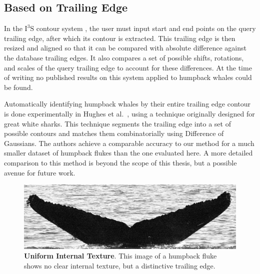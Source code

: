 \subsection{Based on Trailing Edge}

In the $\text{I}^3\text{S}$ contour system \cite{i3scontour}, the user must input start and end points on the query trailing edge, after which its contour is extracted.
This trailing edge is then resized and aligned so that it can be compared with absolute difference against the database trailing edges.
It also compares a set of possible shifts, rotations, and scales of the query trailing edge to account for these differences.
At the time of writing no published results on this system applied to humpback whales could be found.

Automatically identifying humpback whales by their entire trailing edge contour is done experimentally in Hughes et al.\ \cite{hughes2015automated}, using a technique originally designed for great white sharks. 
This technique segments the trailing edge into a set of possible contours and matches them combinatorially using Difference of Gaussians.
The authors achieve a comparable accuracy to our method for a much smaller dataset of humpback flukes than the one evaluated here.
A more detailed comparison to this method is beyond the scope of this thesis, but a possible avenue for future work.

\begin{figure}[t]%
\centering
\includegraphics[width=1.0\textwidth]{../images/unclear_texture.jpg}
\caption{\textbf{Uniform Internal Texture}. This image of a humpback fluke shows no clear internal texture, but a distinctive trailing edge.}
\label{fig:unclear_texture}
\end{figure}

